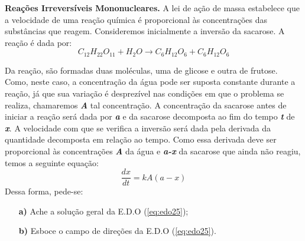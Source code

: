 \linespread{1.5}
\textbf{Reações Irreversíveis Mononucleares.} A lei de ação de massa estabelece que a velocidade de uma reação química é proporcional às concentrações das substâncias que reagem. Consideremos inicialmente a inversão da sacarose. A reação é dada por:
\begin{equation*}
    C_{12}H_{22}O_{11} + H_2O \rightarrow C_6H_{12}O_6 + C_6H_{12}O_6
\end{equation*}

Da reação, são formadas duas moléculas, uma de glicose e outra de frutose. Como, neste caso, a concentração da água pode ser suposta constante durante a reação, já que sua variação é desprezível nas condições em que o problema se realiza, chamaremos \textbf{\textit{A}} tal concentração. A concentração da sacarose antes de iniciar a reação será dada por \textbf{\textit{a}} e da sacarose decomposta ao fim do tempo \textbf{\textit{t}} de \textbf{\textit{x}}. A velocidade com que se verifica a inversão será dada pela derivada da quantidade decomposta em relação ao tempo. Como essa derivada deve ser proporcional às concentrações \textbf{\textit{A}} da água e \textbf{\textit{a-x}} da sacarose que ainda não reagiu, temos a seguinte equação:
\begin{equation}
    \label{eq:edo25}
    \frac{dx}{dt} = kA(a-x)
\end{equation}
Dessa forma, pede-se:
\begin{itemize}
    \item[\textbf{a)}] Ache a solução geral da E.D.O (\ref{eq:edo25});
    \item[\textbf{b)}] Esboce o campo de direções da E.D.O (\ref{eq:edo25}).
\end{itemize}
